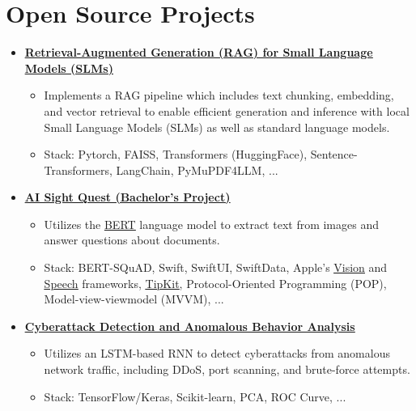 \documentclass[letter,10pt]{article}
\newcommand{\customsquare}{\raisebox{0.25ex}{\scalebox{0.45}{$\blacksquare$}}}
\begin{document}
\section*{Open Source Projects}
\begin{itemize}[label={\customsquare}]
    \item \href{https://github.com/AINexumLab/slm-rag/}{\underline{\textbf{Retrieval-Augmented Generation (RAG) for Small Language Models (SLMs)}}}
    \begin{itemize}
        \item Implements a RAG pipeline which includes text chunking, embedding, and vector retrieval to enable efficient generation and inference with local Small Language Models (SLMs) as well as standard language models.
        \item Stack: Pytorch, FAISS, Transformers (HuggingFace), Sentence-Transformers, LangChain, PyMuPDF4LLM, ...
    \end{itemize}

    \item \href{https://github.com/karami-mehdi/AISightQuest}{\underline{\textbf{AI Sight Quest (Bachelor’s Project)}}}
    \begin{itemize}
        \item Utilizes the \href{https://arxiv.org/abs/1810.04805}{\underline{BERT}} language model to extract text from images and answer questions about documents.
        \item Stack: BERT-SQuAD, Swift, SwiftUI, SwiftData, Apple's \href{https://developer.apple.com/documentation/vision}{\underline{Vision}} and \href{https://developer.apple.com/documentation/speech}{\underline{Speech}} frameworks, \href{https://developer.apple.com/documentation/tipkit}{\underline{TipKit}}, Protocol-Oriented Programming (POP), Model-view-viewmodel (MVVM), ...
    \end{itemize}

    \item \href{https://github.com/karami-mehdi/CyberattackDetection}{\underline{\textbf{Cyberattack Detection and Anomalous Behavior Analysis}}}
    \begin{itemize}
        \item Utilizes an LSTM-based RNN to detect cyberattacks from anomalous network traffic, including DDoS, port scanning, and brute-force attempts.
        \item Stack: TensorFlow/Keras, Scikit-learn, PCA, ROC Curve, ...
    \end{itemize}


\end{itemize}
\end{document}
